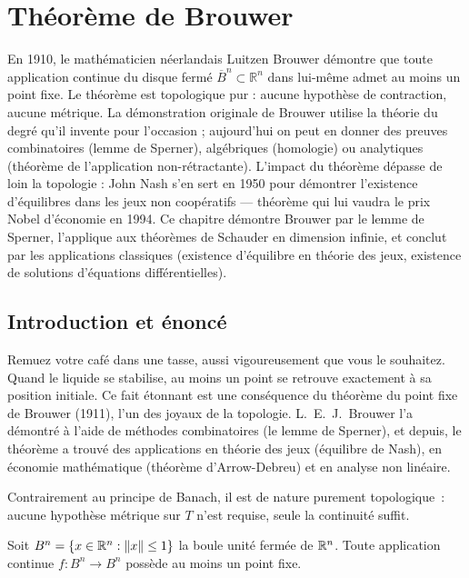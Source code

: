 \chapter{Th\'eor\`eme de Brouwer}\label{ch:brouwer}

En 1910, le mathématicien néerlandais Luitzen Brouwer démontre que toute application continue du disque fermé $\overline{B}^n \subset \mathbb{R}^n$ dans lui-même admet au moins un point fixe. Le théorème est topologique pur : aucune hypothèse de contraction, aucune métrique. La démonstration originale de Brouwer utilise la théorie du degré qu'il invente pour l'occasion ; aujourd'hui on peut en donner des preuves combinatoires (lemme de Sperner), algébriques (homologie) ou analytiques (théorème de l'application non-rétractante). L'impact du théorème dépasse de loin la topologie : John Nash s'en sert en 1950 pour démontrer l'existence d'équilibres dans les jeux non coopératifs --- théorème qui lui vaudra le prix Nobel d'économie en 1994. Ce chapitre démontre Brouwer par le lemme de Sperner, l'applique aux théorèmes de Schauder en dimension infinie, et conclut par les applications classiques (existence d'équilibre en théorie des jeux, existence de solutions d'équations différentielles).

\section{Introduction et \'enonc\'e}

Remuez votre caf\'e dans une tasse, aussi vigoureusement que vous le souhaitez. Quand le liquide se stabilise, au moins un point se retrouve exactement \`a sa position initiale. Ce fait \'etonnant est une cons\'equence du th\'eor\`eme du point fixe de Brouwer (1911), l'un des joyaux de la topologie. L.~E.~J.\ Brouwer l'a d\'emontr\'e \`a l'aide de m\'ethodes combinatoires (le lemme de Sperner), et depuis, le th\'eor\`eme a trouv\'e des applications en th\'eorie des jeux (\'equilibre de Nash), en \'economie math\'ematique (th\'eor\`eme d'Arrow-Debreu) et en analyse non lin\'eaire.

Contrairement au principe de Banach, il est de nature
purement topologique~: aucune hypoth\`ese m\'etrique sur $T$ n'est requise, seule
la continuit\'e suffit.

\begin{theoreme}[Brouwer, 1911]\label{thm:brouwer}
Soit $B^n = \{ x \in \mathbb{R}^n : \left\| x \right\| \leq 1 \}$ la boule unit\'e ferm\'ee de
$\mathbb{R}^n$. Toute application continue $f : B^n \to B^n$ poss\`ede au moins un
point fixe.
\end{theoreme}

